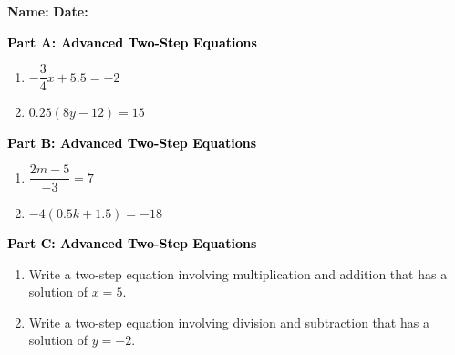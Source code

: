 \documentclass[12pt, letterpaper, fleqn]{article}
\begin{document}
\textbf{Name:} \underline{\hspace{5cm}}
\hfill
\textbf{Date:} \underline{\hspace{3cm}}\\

\begin{tcolorbox}[colback=customteal!20]
\large\textcolor{black}{\textbf{Part A: Advanced Two-Step Equations}}
\end{tcolorbox}

\vspace{3mm}

\begin{enumerate}[itemsep=5.5cm, leftmargin=0.6cm]
\item $-\dfrac{3}{4}x + 5.5 = -2$
\item $0.25(8y - 12) = 15$
\end{enumerate}

\newpage

\begin{tcolorbox}[colback=customteal!20]
\large\textcolor{black}{\textbf{Part B: Advanced Two-Step Equations}}
\end{tcolorbox}

\vspace{3mm}

\begin{enumerate}[itemsep=5.5cm, leftmargin=0.6cm, resume]
\item $\dfrac{2m - 5}{-3} = 7$
\item $-4(0.5k + 1.5) = -18$
\end{enumerate}

\newpage

\begin{tcolorbox}[colback=customteal!20]
\large\textcolor{black}{\textbf{Part C: Advanced Two-Step Equations}}
\end{tcolorbox}

\vspace{3mm}

\begin{enumerate}[itemsep=5.5cm, leftmargin=0.6cm, resume]
\item Write a two-step equation involving multiplication and addition that has a solution of $x = 5$.
\item Write a two-step equation involving division and subtraction that has a solution of $y = -2$.
\end{enumerate}
\end{document}
